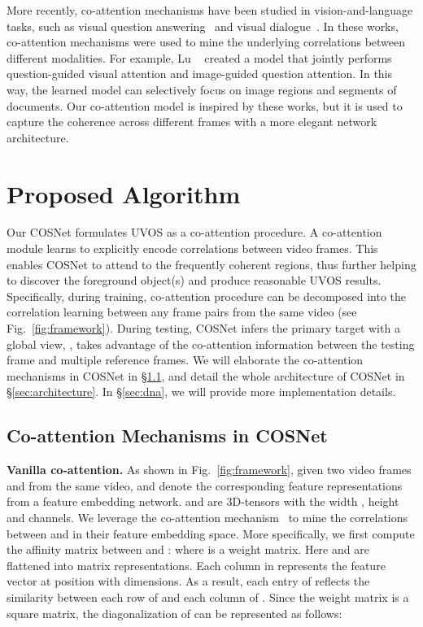 \documentclass[10pt,twocolumn,letterpaper]{article}
\begin{document}
More recently, co-attention mechanisms have been studied in vision-and-language tasks, such as visual question answering~\cite{DBLP:conf/nips/LuYBP16,DBLP:journals/corr/XiongZS16,Wu_2018_CVPR,Nguyen_2018_CVPR} and visual dialogue~\cite{Wu_2018_CVPR}. In these works, co-attention mechanisms were used to mine the underlying correlations between different modalities. For example, Lu \etal~\cite{DBLP:conf/nips/LuYBP16} created a model that jointly performs question-guided visual attention and image-guided question attention. In this way, the learned model can selectively focus on image regions and segments of documents. Our co-attention model is inspired by these works, but it is used to capture the coherence across different frames with a more elegant network architecture.
\section{Proposed Algorithm}
Our COSNet formulates UVOS as a co-attention procedure. A co-attention module learns to explicitly encode correlations between video frames. This enables COSNet to attend to the frequently coherent regions, thus further helping to discover the foreground object(s) and produce reasonable UVOS results. Specifically, during training, co-attention procedure can be decomposed into the correlation learning between any frame pairs from the same video (see Fig.~\ref{fig:framework}). During testing, COSNet infers the primary target with a global view, \ie, takes advantage of the co-attention information between the testing frame and multiple reference frames. We will elaborate the co-attention mechanisms in COSNet in \S\ref{sec:method}, and detail the whole architecture of COSNet in \S\ref{sec:architecture}. In \S\ref{sec:dna}, we will provide more implementation details.
\subsection{Co-attention Mechanisms in COSNet}
\label{sec:method}
\noindent\textbf{Vanilla co-attention.}
As shown in Fig.~\ref{fig:framework}, given two video frames  and  from the same video,  and  denote the corresponding feature representations from a feature embedding network.  and  are 3D-tensors with the width , height  and   channels. We leverage the co-attention mechanism~\cite{DBLP:journals/corr/XiongZS16,DBLP:conf/nips/LuYBP16} to mine the correlations between  and  in their feature embedding space. More specifically, we first compute the affinity matrix  between  and : 
where   is a weight matrix. Here  and   are flattened into matrix representations.  Each column   in  represents the feature vector at position  with  dimensions. As a result, each entry of  reflects the similarity between each row of  and each column of . Since the weight matrix   is a square matrix, the diagonalization of  can be represented as follows:
\end{document}
